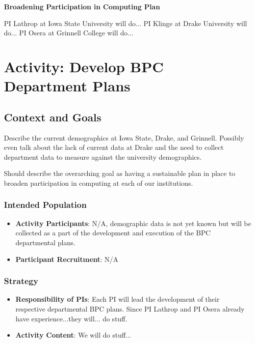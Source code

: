 \documentclass[11pt]{article}
\begin{document}
    \setcounter{page}{1}
    \begin{center}
        {\Large {\bf Broadening Participation in Computing Plan}}
    \end{center}

    PI Lathrop at Iowa State University will do...
    PI Klinge at Drake University will do...
    PI Osera at Grinnell College will do...

    \section{Activity: Develop BPC Department Plans}

    \subsection{Context and Goals}
    Describe the current demographics at Iowa State, Drake, and Grinnell.
    Possibly even talk about the lack of current data at Drake and the need to collect department data to measure against the university demographics.

    Should describe the overarching goal as having a sustainable plan in place to broaden participation in computing at each of our institutions.

    \subsubsection{Intended Population}
    \begin{itemize}
    	\item 
	    \textbf{Activity Participants}: N/A, demographic data is not yet known but will be collected as a part of the development and execution of the BPC departmental plans.

	    \item 
	    \textbf{Participant Recruitment}: N/A
    \end{itemize}

    \subsubsection{Strategy}

    \begin{itemize}
    	\item 
	    \textbf{Responsibility of PIs}: Each PI will lead the development of their respective departmental BPC plans.
	    Since PI Lathrop and PI Osera already have experience...they will... do stuff.

	    \item 
	    \textbf{Activity Content}:
	    We will do stuff...
    \end{itemize}
\end{document}
